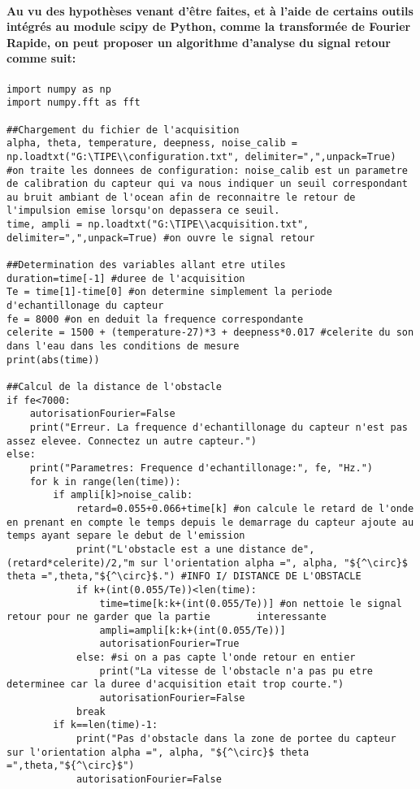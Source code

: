 \documentclass[a4paper,11pt]{article}
\begin{document}
\paragraph{\normalfont Au vu des hypoth\`{e}ses venant d'\^{e}tre faites, et \`{a} l'aide de certains outils int\'{e}gr\'{e}s au module scipy de Python, comme la transform\'{e}e de Fourier Rapide, on peut proposer un algorithme d'analyse du signal retour comme suit:}
\paragraph{\normalfont}
\lstset{language=Python}
\begin{lstlisting}[mathescape]
import numpy as np
import numpy.fft as fft

##Chargement du fichier de l'acquisition
alpha, theta, temperature, deepness, noise_calib = np.loadtxt("G:\TIPE\\configuration.txt", delimiter=",",unpack=True) #on traite les donnees de configuration: noise_calib est un parametre de calibration du capteur qui va nous indiquer un seuil correspondant au bruit ambiant de l'ocean afin de reconnaitre le retour de l'impulsion emise lorsqu'on depassera ce seuil.
time, ampli = np.loadtxt("G:\TIPE\\acquisition.txt", delimiter=",",unpack=True) #on ouvre le signal retour

##Determination des variables allant etre utiles
duration=time[-1] #duree de l'acquisition
Te = time[1]-time[0] #on determine simplement la periode d'echantillonage du capteur
fe = 8000 #on en deduit la frequence correspondante
celerite = 1500 + (temperature-27)*3 + deepness*0.017 #celerite du son dans l'eau dans les conditions de mesure
print(abs(time))

##Calcul de la distance de l'obstacle
if fe<7000:
    autorisationFourier=False
    print("Erreur. La frequence d'echantillonage du capteur n'est pas assez elevee. Connectez un autre capteur.")
else:
    print("Parametres: Frequence d'echantillonage:", fe, "Hz.")
    for k in range(len(time)):
        if ampli[k]>noise_calib:
            retard=0.055+0.066+time[k] #on calcule le retard de l'onde en prenant en compte le temps depuis le demarrage du capteur ajoute au temps ayant separe le debut de l'emission
            print("L'obstacle est a une distance de",(retard*celerite)/2,"m sur l'orientation alpha =", alpha, "${^\circ}$ theta =",theta,"${^\circ}$.") #INFO I/ DISTANCE DE L'OBSTACLE
            if k+(int(0.055/Te))<len(time):
                time=time[k:k+(int(0.055/Te))] #on nettoie le signal retour pour ne garder que la partie        interessante
                ampli=ampli[k:k+(int(0.055/Te))]
                autorisationFourier=True
            else: #si on a pas capte l'onde retour en entier
                print("La vitesse de l'obstacle n'a pas pu etre determinee car la duree d'acquisition etait trop courte.")
                autorisationFourier=False
            break
        if k==len(time)-1:
            print("Pas d'obstacle dans la zone de portee du capteur sur l'orientation alpha =", alpha, "${^\circ}$ theta =",theta,"${^\circ}$")
            autorisationFourier=False 
            

\end{lstlisting}
\end{document}
